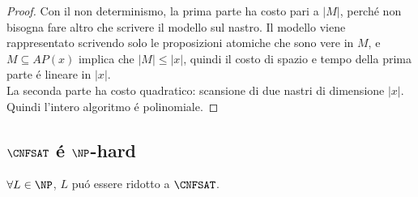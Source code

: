 \begin{proof}
Con il non determinismo, la prima parte ha costo pari a $|M|$, 
perché non bisogna fare altro che scrivere il modello sul nastro.
Il modello viene rappresentato scrivendo solo le proposizioni atomiche che sono vere in $M$, 
e $M \subseteq AP(x)$ implica che $|M| \leq |x|$, quindi il costo di spazio e tempo della prima parte é lineare in $|x|$. \\

La seconda parte ha costo quadratico: scansione di due nastri di dimensione $|x|$.\\

Quindi l'intero algoritmo é polinomiale.
\end{proof}


\newpage
\subsection{$\CNFSAT$ é $\NP$-hard}
$\forall L \in \NP$, $L$ puó essere ridotto a $\CNFSAT$.
